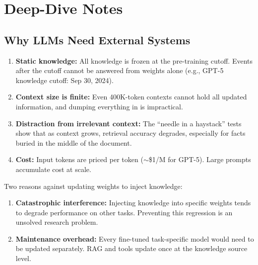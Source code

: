 \documentclass[11pt, a4paper]{article}
\begin{document}
\section{Deep-Dive Notes}

\subsection{Why LLMs Need External Systems}

\begin{defbox}
\begin{enumerate}[leftmargin=1.5em]
  \item \textbf{Static knowledge:} All knowledge is frozen at the pre-training cutoff. Events after the cutoff cannot be answered from weights alone (e.g., GPT-5 knowledge cutoff: Sep 30, 2024).
  \item \textbf{Context size is finite:} Even 400K-token contexts cannot hold all updated information, and dumping everything in is impractical.
  \item \textbf{Distraction from irrelevant context:} The ``needle in a haystack'' tests show that as context grows, retrieval accuracy degrades, especially for facts buried in the middle of the document.
  \item \textbf{Cost:} Input tokens are priced per token ($\sim$\$1/M for GPT-5). Large prompts accumulate cost at scale.
\end{enumerate}
\end{defbox}

\begin{notebox}
Two reasons against updating weights to inject knowledge:
\begin{enumerate}[leftmargin=1.5em]
  \item \textbf{Catastrophic interference:} Injecting knowledge into specific weights tends to degrade performance on other tasks. Preventing this regression is an unsolved research problem.
  \item \textbf{Maintenance overhead:} Every fine-tuned task-specific model would need to be updated separately. RAG and tools update once at the knowledge source level.
\end{enumerate}
\end{notebox}
\end{document}
